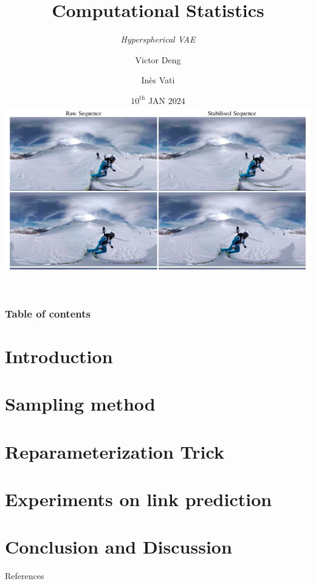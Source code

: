 \documentclass[hyperref={pdftex}]{beamer}
\title{Computational Statistics}
\subtitle{\textit{Hyperspherical VAE}}
\author{Victor Deng \and Inès Vati}
\institute[MVA]{École Normale Supérieure Paris-Saclay, Master MVA}
\date{$10^{\textrm{th}}$ JAN $2024$\\ \vspace{0.3cm} \includegraphics[scale=0.2]{figures/spherical_video.png}}
\begin{document}
\frame[plain]{\titlepage}

\begin{frame}
   \frametitle{Table of contents}
   \tableofcontents[subsectionstyle=hide]
\end{frame} 

\section{Introduction} 


\section{Sampling method}



\section{Reparameterization Trick}


\section{Experiments on link prediction}



\section{Conclusion and Discussion} 


\begin{frame}{References}
  
\end{frame}
\end{document}
